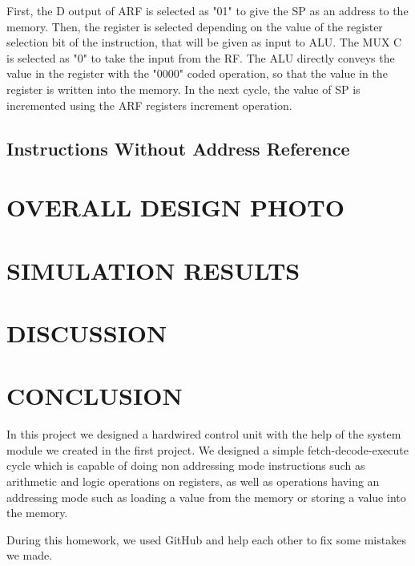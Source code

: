 \documentclass[pdftex,12pt,a4paper]{article}
\begin{document}
First, the D output of ARF is selected as "01" to give the SP as an address to the memory. Then, the register is 
selected depending on the value of the register selection bit of the instruction, that will be given as input to ALU.
The MUX C is selected as "0" to take the input from the RF. The ALU directly conveys the value in the register with 
the "0000" coded operation, so that the value in the register is written into the memory. In the next cycle, the value 
of SP is incremented using the ARF registers increment operation.


\subsection{Instructions Without Address Reference}






\section{OVERALL DESIGN PHOTO}








\section{SIMULATION RESULTS}




\section{DISCUSSION}






\section{CONCLUSION}
In this project we designed a hardwired control unit with the help of the system module we created in the
first project. We designed a simple fetch-decode-execute cycle which is capable of doing non addressing
mode instructions such as arithmetic and logic operations on registers, as well as operations having an
addressing mode such as loading a value from the memory or storing a value into the memory.

During this homework, we used GitHub and help each other to fix some mistakes we made.  
\end{document}
